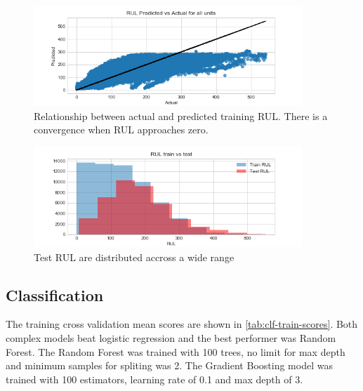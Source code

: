\documentclass[letterpaper, 10 pt, conference, onecolumn]{ieeeconf}  %
\begin{document}
\begin{figure}[!h]
    \centering
    \includegraphics[width=0.9\textwidth]{plots/reg_rul_pred_true.png}
    \caption{Relationship between actual and predicted training RUL. There is a convergence when RUL approaches zero.}
    \label{fig:rul-actual-pred}
\end{figure}

\begin{figure}[!h]
    \centering
    \includegraphics[width=0.9\textwidth]{plots/hist_rul_train_test.png}
    \caption{Test RUL are distributed accross a wide range}
    \label{fig:test-rul-dist}
\end{figure}

\subsection{Classification}
The training cross validation mean scores are shown in \autoref{tab:clf-train-scores}. Both complex models beat logistic regression and the best performer was Random Forest. The Random Forest was trained with 100 trees, no limit for max depth and minimum samples for spliting was 2. The Gradient Boosting model was trained with 100 estimators, learning rate of 0.1 and max depth of 3.
\end{document}
